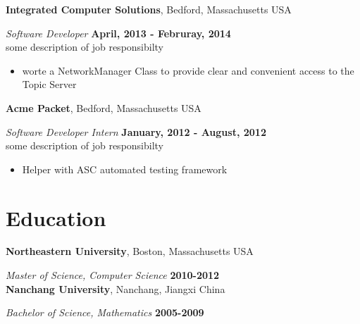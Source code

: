 \documentclass[margin,line]{res}
\begin{document}
\begin{resume}
{\bf Integrated Computer Solutions}, Bedford, Massachusetts USA

\vspace{-.3cm}
{\em Software Developer} \hfill {\bf April, 2013 - Februray, 2014}\\
some description of job responsibilty
\begin{itemize}
\item worte a NetworkManager Class to provide clear and convenient access to the
Topic Server
\end{itemize}

{\bf Acme Packet}, Bedford, Massachusetts USA

\vspace{-.3cm}
{\em Software Developer Intern} \hfill {\bf January, 2012 - August, 2012}\\
some description of job responsibilty
\begin{itemize}
\item Helper with ASC automated testing framework
\end{itemize}

\section{\sc Education}
{\bf Northeastern University}, Boston, Massachusetts USA

\vspace{-.3cm}
{\em Master of Science, Computer Science} \hfill {\bf 2010-2012}\\

{\bf Nanchang University}, Nanchang, Jiangxi China

\vspace{-.3cm}
{\em Bachelor of Science, Mathematics} \hfill {\bf 2005-2009}\\




\end{resume}
\end{document}
